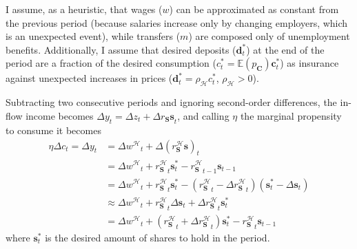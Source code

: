 \documentclass[a4paper, headings=standardclasses]{scrartcl}
\begin{document}
I assume, as a heuristic, that wages ($w$) can be approximated as constant from the previous period (because salaries increase only by changing employers, which is an unexpected event), while transfers ($m$) are composed only of unemployment benefits.
Additionally, I assume that desired deposits ($\mathbf{d}^*_t$) at the end of the period are a fraction of the desired consumption ($c^*_t = \mathbb{E}(p_\mathbf{C}) \mathbf{c}^*_t$) as insurance against unexpected increases in prices ($\mathbf{d}^*_t = \rho_\mathcal{H}c^*_t$, $\rho_\mathcal{H} > 0$).

Subtracting two consecutive periods and ignoring second-order differences, the in-flow income becomes ${\Delta y}_t = {\Delta z}_t + {\Delta r_\mathbf{S} \mathbf{s} }_t$, and calling $\eta$ the marginal propensity to consume it becomes
\begin{align*}
    \eta {\Delta c}_t = {\Delta y}_t & = {\Delta w^{\mathcal{H}}}_t + {\Delta (r^{\mathcal{H}}_\mathbf{S} \mathbf{s})}_t                                                                                                                        \\
                                     & = {\Delta w^{\mathcal{H}}}_t + {r^{\mathcal{H}}_\mathbf{S}}_t \mathbf{s}^*_t - {r^{\mathcal{H}}_\mathbf{S}}_{t-1} \mathbf{s}_{t-1}                                                                       \\
                                     & = {\Delta w^{\mathcal{H}}}_t + {r^{\mathcal{H}}_\mathbf{S}}_t \mathbf{s}^*_t - ({r^{\mathcal{H}}_\mathbf{S}}_{t} - {\Delta r^{\mathcal{H}}_\mathbf{S}}_{t}) (\mathbf{s}^*_{t} - {\Delta \mathbf{s}}_{t}) \\
                                     & \approx {\Delta w^{\mathcal{H}}}_t + {r^{\mathcal{H}}_\mathbf{S}}_t {\Delta \mathbf{s}}_t + {\Delta r^{\mathcal{H}}_\mathbf{S}}_{t} \mathbf{s}^*_{t}                                                     \\
                                     & = {\Delta w^{\mathcal{H}}}_t + ({r^{\mathcal{H}}_\mathbf{S}}_t + {\Delta r^{\mathcal{H}}_\mathbf{S}}_{t})\mathbf{s}^*_t - {r^{\mathcal{H}}_\mathbf{S}}_{t} \mathbf{s}_{t-1}
\end{align*}
where $\mathbf{s}^*_t$ is the desired amount of shares to hold in the period.
\end{document}
